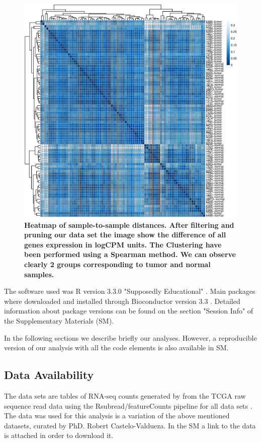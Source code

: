 \documentclass[9pt,twocolumn,twoside]{gsajnl}
\begin{document}
\begin{figure}[!h]
\centering

\includegraphics[width=.7\textwidth]{Clustering.eps}

\caption{\bf Heatmap of sample-to-sample distances. After filtering and pruning our data set the image show the difference of all genes expression in logCPM units. The Clustering have been performed using a Spearman method. We can observe clearly 2 groups corresponding to tumor and normal samples. 
}
\label{fig:Clustering}
\end{figure}

The software used was R version 3.3.0 "Supposedly Educational" \citep{R}. Main packages where downloaded and installed through Bioconductor version 3.3 \citep{bioconductor}. Detailed information about package versions can be found on the section "Session Info" of the Supplementary Materials (SM).

In the following sections we describe briefly our analyses. However, a reproducible version of our analysis with all the code elements is also available in SM.


\subsection*{Data Availability}

The data sets are tables of RNA-seq counts generated by \cite{Rahman15112015} from the TCGA raw sequence read data using the Rsubread/featureCounts pipeline for all data sets \citep{Rsubread}. The data was used for this analysis is a variation of the above mentioned datasets, curated by PhD. Robert Castelo-Valdueza. In the SM a link to the data is attached in order to download it. 
\end{document}
